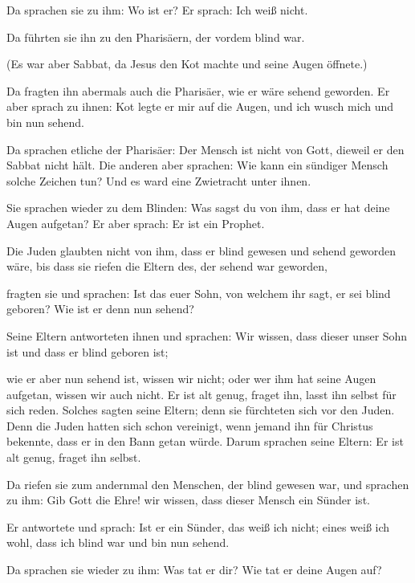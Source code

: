  Da sprachen sie zu ihm: Wo ist er? Er sprach: Ich weiß
nicht.

 Da führten sie ihn zu den Pharisäern, der vordem blind
war.

 (Es war aber Sabbat, da Jesus den Kot machte und seine
Augen öffnete.)

 Da fragten ihn abermals auch die Pharisäer, wie er wäre
sehend geworden. Er aber sprach zu ihnen: Kot legte er mir auf die
Augen, und ich wusch mich und bin nun sehend.

 Da sprachen etliche der Pharisäer: Der Mensch ist nicht
von Gott, dieweil er den Sabbat nicht hält. Die anderen aber sprachen:
Wie kann ein sündiger Mensch solche Zeichen tun? Und es ward eine
Zwietracht unter ihnen.

 Sie sprachen wieder zu dem Blinden: Was sagst du von
ihm, dass er hat deine Augen aufgetan? Er aber sprach: Er ist ein
Prophet.

 Die Juden glaubten nicht von ihm, dass er blind gewesen
und sehend geworden wäre, bis dass sie riefen die Eltern des, der sehend
war geworden,

 fragten sie und sprachen: Ist das euer Sohn, von welchem
ihr sagt, er sei blind geboren? Wie ist er denn nun sehend?

 Seine Eltern antworteten ihnen und sprachen: Wir wissen,
dass dieser unser Sohn ist und dass er blind geboren ist;

 wie er aber nun sehend ist, wissen wir nicht; oder wer
ihm hat seine Augen aufgetan, wissen wir auch nicht. Er ist alt genug,
fraget ihn, lasst ihn selbst für sich reden.  Solches
sagten seine Eltern; denn sie fürchteten sich vor den Juden. Denn die
Juden hatten sich schon vereinigt, wenn jemand ihn für Christus
bekennte, dass er in den Bann getan würde.  Darum
sprachen seine Eltern: Er ist alt genug, fraget ihn selbst.

 Da riefen sie zum andernmal den Menschen, der blind
gewesen war, und sprachen zu ihm: Gib Gott die Ehre! wir wissen, dass
dieser Mensch ein Sünder ist.

 Er antwortete und sprach: Ist er ein Sünder, das weiß
ich nicht; eines weiß ich wohl, dass ich blind war und bin nun sehend.

 Da sprachen sie wieder zu ihm: Was tat er dir? Wie tat
er deine Augen auf?

